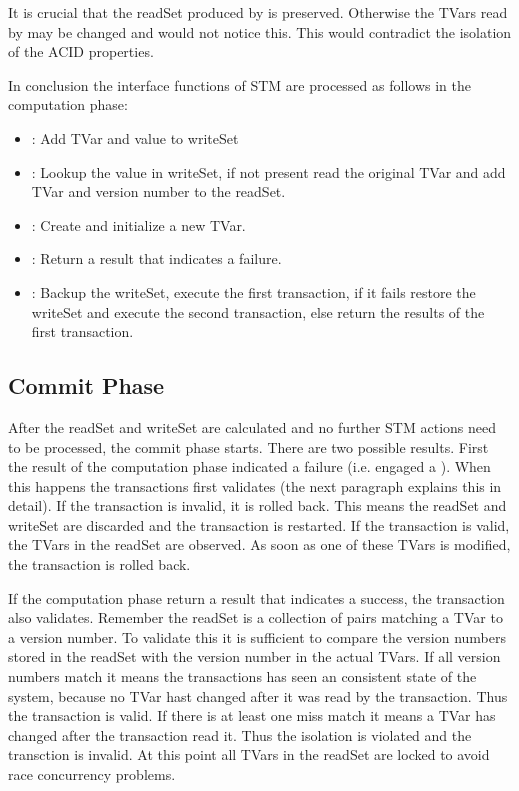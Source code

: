 It is crucial that the readSet produced by  is preserved. Otherwise the TVars read by  may be changed and 
 would not notice this. This would contradict the isolation of the ACID properties. 

In conclusion the interface functions of STM are processed as follows in the computation phase:
\begin{itemize}
 \item {}: Add TVar and value to writeSet
 \item {}: Lookup the value in writeSet, if not present read the original TVar and add TVar and version number to the readSet.
 \item {}: Create and initialize a new TVar. 
 \item {}: Return a result that indicates a failure.
 \item {}: Backup the writeSet, execute the first transaction, if it fails restore the writeSet and execute the second transaction, else return the results of the first transaction.
\end{itemize}

\subsection{Commit Phase}
After the readSet and writeSet are calculated and no further STM actions need to be processed, the commit phase starts.
There are two possible results. First the result of the computation phase indicated a failure (i.e. engaged a ).
When this happens the transactions first validates (the next paragraph explains this in detail). If the transaction is invalid, 
it is rolled back. This means the readSet and writeSet are discarded and the transaction is restarted. If the transaction is
valid, the TVars in the readSet are observed. As soon as one of these TVars is modified, the transaction is rolled back.

If the computation phase return a result that indicates a success, the transaction also validates.
Remember the readSet is a collection of pairs matching a TVar to a version number.
To validate this it is sufficient to compare the version numbers stored in the readSet with the 
version number in the actual TVars. If all version numbers match it means the transactions has seen an consistent state
of the system, because no TVar hast changed after it was read by the transaction. Thus the transaction is valid.
If there is at least one miss match it means a TVar has changed after the transaction read it. Thus the isolation
is violated and the transction is invalid. At this point all TVars in the readSet are locked to avoid race concurrency problems. 

